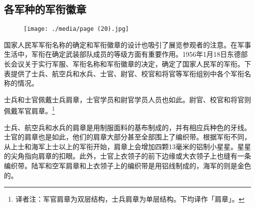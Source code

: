 \subsection{各军种的军衔徽章}

\begin{figure}
\texttt{[image: ./media/page (20).jpg]}
\end{figure}

国家人民军军衔名称的确定和军衔徽章的设计也吸引了展览参观者的注意。在军事生活中，军衔在确定武装部队成员的等级方面有重要作用。1956年1月18日东德部长会议关于实行军服、军衔名称和军衔徽章的决定，确定了国家人民军的军衔。下表提供了士兵、航空兵和水兵、士官、尉官、校官和将官等军衔组别中各个军衔名称的情况。

士兵和士官佩戴士兵肩章，士官学员和尉官学员人员也如此。尉官、校官和将官则佩戴军官肩章。\footnote{译者注：军官肩章为双层结构，士兵肩章为单层结构。\cite{clarionv}下均译作「肩章」。}

士兵、航空兵和水兵的肩章是用制服面料的基布制成的，并有相应兵种色的牙线。士官的肩章也是如此，他们的肩章大部分甚至全部围上了编织带。根据军衔不同，从上士和海军上士以上的军衔开始，肩章上会增加四颗13毫米的铝制小星星。星星的尖角指向肩章的扣眼。此外，士官上衣领子的前下边缘或大衣领子上也缝有一条编织带。陆军和空军肩章和上衣领子上的编织带是用铝线制成的，海军的则是金色的。

